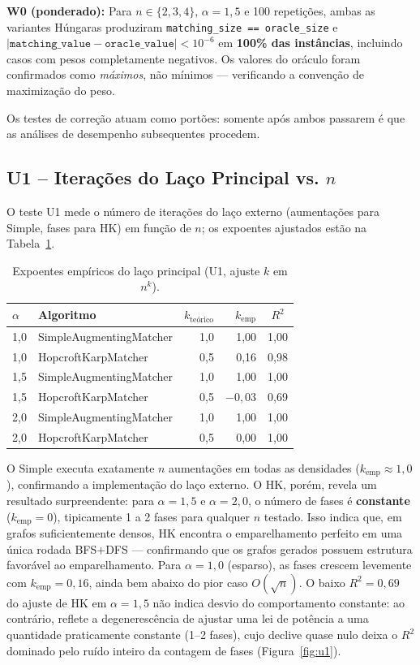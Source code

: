 \documentclass{infufrgs}
\begin{document}
\textbf{W0 (ponderado):} Para $n \in \{2,3,4\}$, $\alpha = 1{,}5$ e 100 repetições, ambas as variantes Húngaras produziram \texttt{matching\_size == oracle\_size} e $|\texttt{matching\_value} - \texttt{oracle\_value}| < 10^{-6}$ em \textbf{100\% das instâncias}, incluindo casos com pesos completamente negativos. Os valores do oráculo foram confirmados como \emph{máximos}, não mínimos --- verificando a convenção de maximização do peso.

Os testes de correção atuam como portões: somente após ambos passarem é que as análises de desempenho subsequentes procedem.

\subsection{U1 -- Iterações do Laço Principal vs. $n$}

O teste U1 mede o número de iterações do laço externo (aumentações para Simple, fases para HK) em função de $n$; os expoentes ajustados estão na Tabela~\ref{tab:u1-exponents}.

\begin{table}[H]
\centering
\caption{Expoentes empíricos do laço principal (U1, ajuste $k$ em $n^k$).}
\label{tab:u1-exponents}
\begin{tabular}{llrrc}
\toprule
$\alpha$ & Algoritmo & $k_\text{teórico}$ & $k_\text{emp}$ & $R^2$ \\
\midrule
1{,}0 & SimpleAugmentingMatcher & 1{,}0 & 1{,}00 & 1{,}00 \\
1{,}0 & HopcroftKarpMatcher     & 0{,}5 & 0{,}16 & 0{,}98 \\
1{,}5 & SimpleAugmentingMatcher & 1{,}0 & 1{,}00 & 1{,}00 \\
1{,}5 & HopcroftKarpMatcher     & 0{,}5 & $-0{,}03$ & 0{,}69 \\
2{,}0 & SimpleAugmentingMatcher & 1{,}0 & 1{,}00 & 1{,}00 \\
2{,}0 & HopcroftKarpMatcher     & 0{,}5 & 0{,}00 & 1{,}00 \\
\bottomrule
\end{tabular}
\end{table}

O Simple executa exatamente $n$ aumentações em todas as densidades ($k_\text{emp} \approx 1{,}0$), confirmando a implementação do laço externo. O HK, porém, revela um resultado surpreendente: para $\alpha = 1{,}5$ e $\alpha = 2{,}0$, o número de fases é \textbf{constante} ($k_\text{emp} = 0$), tipicamente 1 a 2 fases para qualquer $n$ testado. Isso indica que, em grafos suficientemente densos, HK encontra o emparelhamento perfeito em uma única rodada BFS+DFS --- confirmando que os grafos gerados possuem estrutura favorável ao emparelhamento. Para $\alpha = 1{,}0$ (esparso), as fases crescem levemente com $k_\text{emp} = 0{,}16$, ainda bem abaixo do pior caso $O(\sqrt{n})$. O baixo $R^2 = 0{,}69$ do ajuste de HK em $\alpha = 1{,}5$ não indica desvio do comportamento constante: ao contrário, reflete a degenerescência de ajustar uma lei de potência a uma quantidade praticamente constante (1--2 fases), cujo declive quase nulo deixa o $R^2$ dominado pelo ruído inteiro da contagem de fases (Figura~\ref{fig:u1}).
\end{document}
